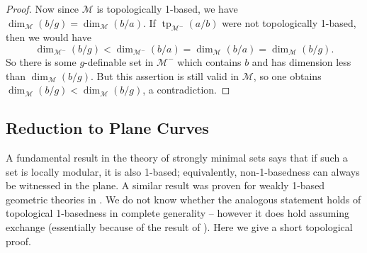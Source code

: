 \documentclass{amsart}
\theoremstyle{definition}
\newcommand{\tp}{\operatorname{tp}}
\begin{document}
\begin{proof}
    Now since $\mathcal M$ is topologically 1-based, we have $\dim_{\mathcal M}(b/g)=\dim_{\mathcal M}(b/a)$. If $\tp_{\mathcal M^-}(a/b)$ were not topologically 1-based, then we would have $$\dim_{\mathcal M^-}(b/g)<\dim_{\mathcal M^-}(b/a)=\dim_{\mathcal M}(b/a)=\dim_{\mathcal M}(b/g).$$ So there is some $g$-definable set in $\mathcal M^-$ which contains $b$ and has dimension less than $\dim_{\mathcal M}(b/g)$. But this assertion is still valid in $\mathcal M$, so one obtains $\dim_{\mathcal M}(b/g)<\dim_{\mathcal M}(b/g)$, a contradiction.
\end{proof}

\subsection{Reduction to Plane Curves} A fundamental result in the theory of strongly minimal sets says that if such a set is locally modular, it is also 1-based; equivalently, non-1-basedness can always be witnessed in the plane. A similar result was proven for weakly 1-based geometric theories in \cite[Proposition 2.15]{BerVas}. We do not know whether the analogous statement holds of topological 1-basedness in complete generality -- however it does hold assuming exchange (essentially because of the result of \cite{BerVas}). Here we give a short topological proof.
\end{document}
